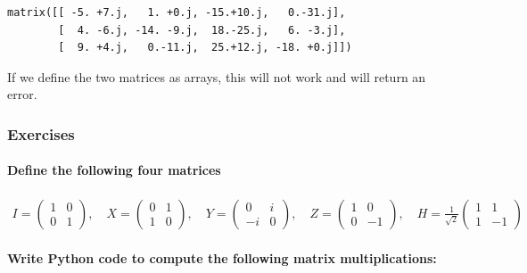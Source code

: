 \documentclass[11pt]{article}
\newcommand{\prompt}[4]{
        \llap{{\color{#2}[#3]: #4}}\vspace{-1.25em}
    }
\begin{document}
            \begin{tcolorbox}[breakable, boxrule=.5pt, size=fbox, pad at break*=1mm, opacityfill=0]
\prompt{Out}{outcolor}{50}{\hspace{3.5pt}}
\begin{Verbatim}[commandchars=\\\{\}]
matrix([[ -5. +7.j,   1. +0.j, -15.+10.j,   0.-31.j],
        [  4. -6.j, -14. -9.j,  18.-25.j,   6. -3.j],
        [  9. +4.j,   0.-11.j,  25.+12.j, -18. +0.j]])
\end{Verbatim}
\end{tcolorbox}
        
    If we define the two matrices as arrays, this will not work and will
return an error.

    \hypertarget{exercises}{%
\subsubsection{Exercises}\label{exercises}}

    \hypertarget{define-the-following-four-matrices}{%
\paragraph{Define the following four
matrices}\label{define-the-following-four-matrices}}

\begin{align}
I = \begin{pmatrix} 1&0 \\ 0&1 \end{pmatrix}, \quad
X = \begin{pmatrix} 0&1 \\ 1&0 \end{pmatrix}, \quad
Y = \begin{pmatrix} 0&i \\ -i&0 \end{pmatrix}, \quad
Z = \begin{pmatrix} 1&0 \\ 0&-1 \end{pmatrix}, \quad
H = \frac{1}{\sqrt{2}} \begin{pmatrix} 1&1 \\ 1&-1 \end{pmatrix}
\end{align}

    \hypertarget{write-python-code-to-compute-the-following-matrix-multiplications}{%
\paragraph{Write Python code to compute the following matrix
multiplications:}\label{write-python-code-to-compute-the-following-matrix-multiplications}}
\end{document}
